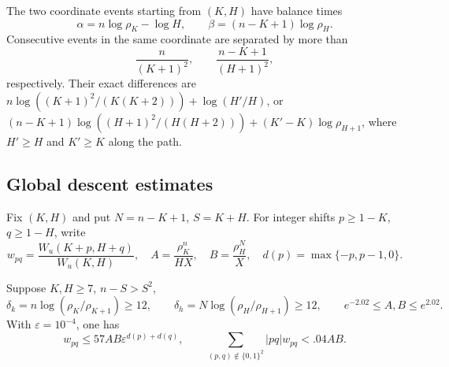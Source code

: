 The two coordinate events starting from $(K,H)$ have balance times
\begin{equation}\label{eq:bridge-balances}
 \alpha=n\log\rho_K-\log H,\qquad
 \beta=(n-K+1)\log\rho_H.
\end{equation}
Consecutive events in the same coordinate are separated by more than
\begin{equation}\label{eq:bridge-spacing}
 \frac{n}{(K+1)^2},\qquad \frac{n-K+1}{(H+1)^2},
\end{equation}
respectively. Their exact differences are
$n\log((K+1)^2/(K(K+2)))+\log(H'/H)$, or
$(n-K+1)\log((H+1)^2/(H(H+2)))+(K'-K)\log\rho_{H+1}$,
where $H'\ge H$ and $K'\ge K$ along the path.

\subsection{Global descent estimates}

Fix $(K,H)$ and put $N=n-K+1$, $S=K+H$. For integer shifts
$p\ge1-K$, $q\ge1-H$, write
\[
 w_{pq}=\frac{W_u(K+p,H+q)}{W_u(K,H)},\quad
 A=\frac{\rho_K^n}{HX},\quad B=\frac{\rho_H^N}{X},\quad
 d(p)=\max\{-p,p-1,0\}.
\]

\begin{lemma}\label{lem:bridge-joint}
Suppose $K,H\ge7$, $n-S>S^2$,
\[
 \delta_k=n\log(\rho_K/\rho_{K+1})\ge12,\qquad
 \delta_h=N\log(\rho_H/\rho_{H+1})\ge12,\qquad
 e^{-2.02}\le A,B\le e^{2.02}.
\]
With $\varepsilon=10^{-4}$, one has
\[
 w_{pq}\le57AB\varepsilon^{d(p)+d(q)},\qquad
 \sum_{(p,q)\notin\{0,1\}^2}|pq|w_{pq}<.04AB.
\]
\end{lemma}

